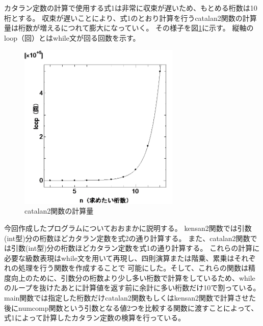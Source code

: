 \documentclass[a4j,dvipdfmx,titlepage]{jarticle}
\begin{document}
カタラン定数の計算で使用する式1は非常に収束が遅いため、もとめる桁数は10桁とする。
収束が遅いことにより、式1のとおり計算を行うcatalan2関数の計算量は桁数が増えるにつれて膨大になっていく。
その様子を図\ref{teigi}に示す。 縦軸のloop（回）とはwhile文が回る回数を示す。
\begin{figure}[H]
  \begin{center}
    \includegraphics[height=8.0cm]{teigi.png}
    \caption{catalan2関数の計算量}
    \label{teigi}
  \end{center}
\end{figure}
今回作成したプログラムについておおまかに説明する。
kensan2関数では引数(int型)分の桁数ほどカタラン定数を式2の通り計算する。
また、catalan2関数では引数(int型)分の桁数ほどカタラン定数を式1の通り計算する。
これらの計算に必要な級数表現はwhile文を用いて再現し、四則演算または階乗、累乗はそれぞれの処理を行う関数を作成することで
可能にした。そして、これらの関数は精度向上のために、引数分の桁数より少し多い桁数で計算をしているため、whileのループを抜けたあとに計算値を返す前に余計に多い桁数だけ10で割っている。
main関数では指定した桁数だけcatalan2関数もしくはkensan2関数で計算させた後にnumcomp関数という引数となる値2つを比較する関数に渡すことによって、式1によって計算したカタラン定数の検算を行っている。
\end{document}

